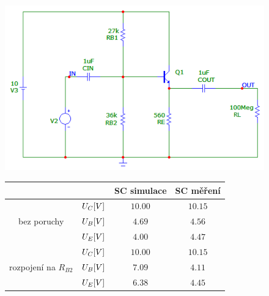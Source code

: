 \documentclass{article}
\begin{document}
\begin{figure}[H]
  \begin{minipage}[t]{0.55\textwidth}
    \vspace{10mm}
    \includegraphics[width=\textwidth]{sim/ukol2/sch.png}
    \caption{Schéma zapojení bez poruchy}
    \label{fig:sch-se}
  \end{minipage}
  \hfil
  \begin{minipage}[t]{0.4\textwidth}
    \begin{table}[H]
      \centering
      \vspace{-10mm}
      \begin{tabular}{|c|c|c|c|}
      \hline
                                                &               & SC simulace                & SC měření                  \\ \hline  
      \multirow{3}{*}{bez poruchy}              &	\(U_C\-[V]\)  & \(10.00\)                  & \(10.15\)                  \\ \cline{2-4}
                                                & \(U_B\-[V]\)  & \(4.69\)                   & \(4.56\)                   \\ \cline{2-4}
                                                & \(U_E\-[V]\)  & \(4.00\)                   & \(4.47\)                   \\ \hline
      \multirow{3}{*}{rozpojení na \(R_{B2}\)}  &	\(U_C\-[V]\)  & \(10.00\)                  & \(10.15\)                  \\ \cline{2-4}
                                                & \(U_B\-[V]\)  & \(7.09\)                   & \(4.11\)                   \\ \cline{2-4}
                                                & \(U_E\-[V]\)  & \(6.38\)                   & \(4.45\)                   \\ \hline

\end{tabular}
\end{table}
\end{minipage}
\end{figure}
\end{document}
